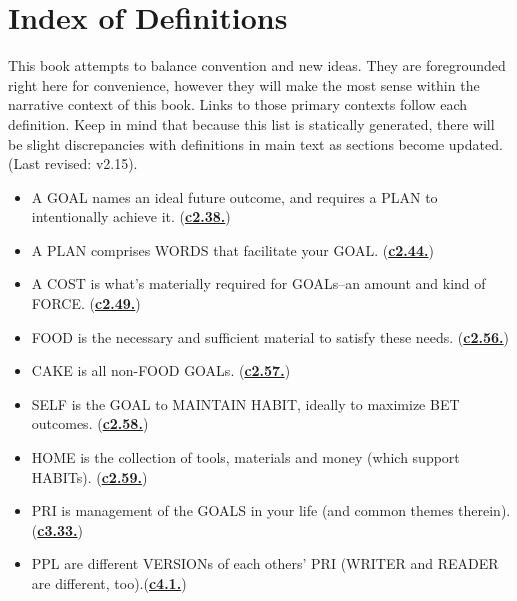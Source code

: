 \documentclass[
]{book}
\providecommand{\tightlist}{%
  \setlength{\itemsep}{0pt}\setlength{\parskip}{0pt}}
\begin{document}
\hypertarget{index-of-definitions}{%
\section{Index of Definitions}\label{index-of-definitions}}

This book attempts to balance convention and new ideas. They are foregrounded right here for convenience, however they will make the most sense within the narrative context of this book. Links to those primary contexts follow each definition. Keep in mind that because this list is statically generated, there will be slight discrepancies with definitions in main text as sections become updated. (Last revised: v2.15).

\begin{itemize}
\tightlist
\item
  A GOAL names an ideal future outcome, and requires a PLAN to intentionally achieve it. (\protect\hyperlink{core-concepts}{\textbf{c2.38.}})\\
\item
  A PLAN comprises WORDS that facilitate your GOAL. (\protect\hyperlink{core-concepts}{\textbf{c2.44.}})\\
\item
  A COST is what's materially required for GOALs--an amount and kind of FORCE. (\protect\hyperlink{core-concepts}{\textbf{c2.49.}})\\
\item
  FOOD is the necessary and sufficient material to satisfy these needs. (\protect\hyperlink{self-1}{\textbf{c2.56.}})\\
\item
  CAKE is all non-FOOD GOALs. (\protect\hyperlink{self-1}{\textbf{c2.57.}})\\
\item
  SELF is the GOAL to MAINTAIN HABIT, ideally to maximize BET outcomes. (\protect\hyperlink{self-1}{\textbf{c2.58.}})\\
\item
  HOME is the collection of tools, materials and money (which support HABITs). (\protect\hyperlink{home}{\textbf{c2.59.}})\\
\item
  PRI is management of the GOALS in your life (and common themes therein). (\protect\hyperlink{attention-and-time}{\textbf{c3.33.}})\\
\item
  PPL are different VERSIONs of each others' PRI (WRITER and READER are different, too).(\protect\hyperlink{ppl}{\textbf{c4.1.}})\\

\end{itemize}
\end{document}
